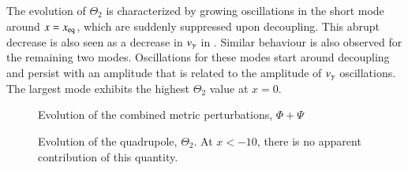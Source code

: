 The evolution of $\Theta_2$ is characterized by growing oscillations in the short mode around $x=x_\mathrm{eq}$, which are suddenly suppressed upon decoupling. This abrupt decrease is also seen as a decrease in $v_\gamma$ in . Similar behaviour is also observed for the remaining two modes. Oscillations for these modes start around decoupling and persist with an amplitude that is related to the amplitude of $v_\gamma$ oscillations. The largest mode exhibits the highest $\Theta_2$ value at $x=0$.

\begin{figure}[ht!]
    \caption{Evolution of the combined metric perturbations, $\Phi+\Psi$}
    \label{fig:M3:results:Phi_plus_Psi}
\end{figure}

  
\begin{figure}[ht!]
    \caption{Evolution of the quadrupole, $\Theta_2$. At $x<-10$, there is no apparent contribution of this quantity.}
    \label{fig:M3:results:Theta2}
\end{figure}
